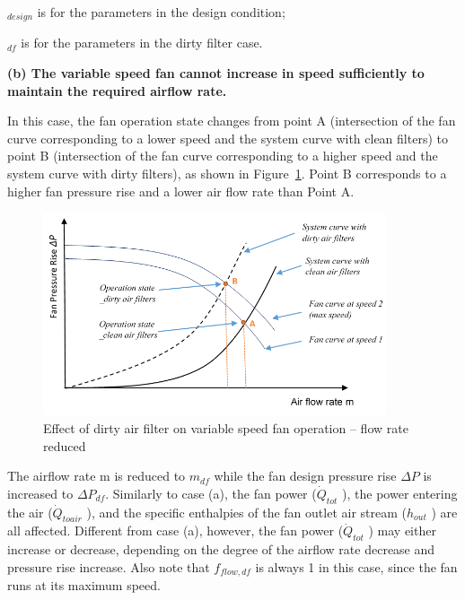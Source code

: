 \(_{design}\) is for the parameters in the design condition;

\(_{df}\) is for the parameters in the dirty filter case.

\textbf{(b) The variable speed fan cannot increase in speed sufficiently to maintain the required airflow rate.}

In this case, the fan operation state changes from point A (intersection of the fan curve corresponding to a lower speed and the system curve with clean filters) to point B (intersection of the fan curve corresponding to a higher speed and the system curve with dirty filters), as shown in Figure~\ref{fig:effect-of-dirty-air-filter-on-variable-speed-001}. Point B corresponds to a higher fan pressure rise and a lower air flow rate than Point A.

\begin{figure}[hbtp] %
\centering
\includegraphics[width=0.9\textwidth, height=0.9\textheight, keepaspectratio=true]{media/image8007.png}
\caption{Effect of dirty air filter on variable speed fan operation – flow rate reduced \protect \label{fig:effect-of-dirty-air-filter-on-variable-speed-001}}
\end{figure}

The airflow rate m is reduced to \(m_{df}\) while the fan design pressure rise \(\Delta P\) is increased to \(\Delta P_{df}\). Similarly to case (a), the fan power (\(\dot Q_{tot}\) ), the power entering the air (\(\dot Q_{toair}\) ), and the specific enthalpies of the fan outlet air stream (\(h_{out}\) ) are all affected. Different from case (a), however, the fan power (\(\dot Q_{tot}\) ) may either increase or decrease, depending on the degree of the airflow rate decrease and pressure rise increase. Also note that \(f_{flow,df}\) is always 1 in this case, since the fan runs at its maximum speed.

